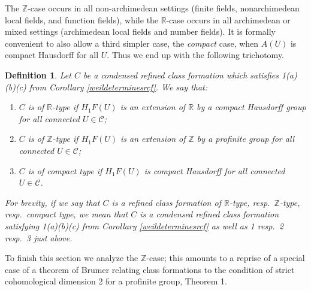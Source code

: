 \documentclass[12pt]{article}
\newtheorem{definition}[theorem]{Definition}
\theoremstyle{definition}
\newcommand{\mc}{\mathcal}
\newcommand{\mbb}{\mathbb}
\begin{document}
The $\mbb{Z}$-case occurs in all non-archimedean settings (finite fields, nonarchimedean local fields, and function fields), while the $\mbb{R}$-case occurs in all archimedean or mixed settings  (archimedean local fields and number fields).  It is formally convenient to also allow a third simpler case, the \emph{compact} case, when $A(U)$ is compact Hausdorff for all $U$.  Thus we end up with the following trichotomy.

\begin{definition}\label{zrcompact}
Let $C$ be a condensed refined class formation which satisfies 1(a)(b)(c) from Corollary \ref{weildeterminesrcf}.  We say that:
\begin{enumerate}
\item $C$ is of $\mbb{R}$-type if $H_1F(U)$ is an extension of $\mbb{R}$ by a compact Hausdorff group for all connected $U\in\mc{C}$;
\item $C$ is of $\mbb{Z}$-type if $H_1F(U)$ is an extension of $\mbb{Z}$ by a profinite group for all connected $U\in\mc{C}$;
\item $C$ is of compact type if $H_1F(U)$ is compact Hausdorff for all connected $U\in\mc{C}$.
\end{enumerate}
For brevity, if we say that $C$ is a \emph{refined class formation of $\mbb{R}$-type, resp.\ $\mbb{Z}$-type, resp.\ compact type}, we mean that $C$ is a condensed refined class formation satisfying 1(a)(b)(c) from Corollary \ref{weildeterminesrcf} as well as 1 resp.\ 2 resp.\ 3 just above.
\end{definition}

To finish this section we analyze the $\mbb{Z}$-case; this amounts to a reprise of a special case of a theorem of Brumer relating class formations to the condition of strict cohomological dimension 2 for a profinite group, \cite{brumer} Theorem 1.
\end{document}
